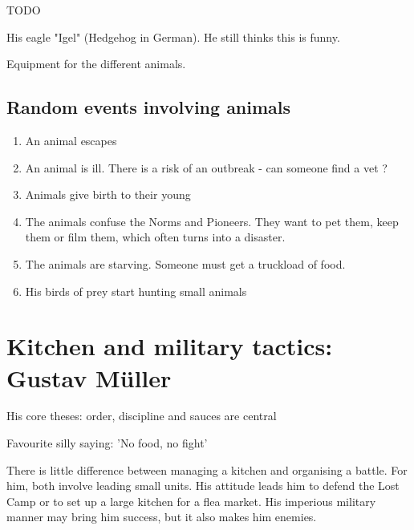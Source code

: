 \begin{npcBox}[title=Jonas Ohnesorg]
    \begin{consequences}
    \item {}
    \item {}
    \item {}
    \end{consequences}

    \begin{npcDescription}
    TODO
    \end{npcDescription}


    \begin{equipment}
    \item His eagle "Igel" (Hedgehog in German). He still thinks this is funny.
    \item Equipment for the different animals.
    \end{equipment}
\end{npcBox}


\subsection{Random events involving animals}

\begin{enumerate}
\item An animal escapes
\item An animal is ill. There is a risk of an outbreak - can someone find a vet ?
\item Animals give birth to their young
\item The animals confuse the Norms and Pioneers. They want to pet them, keep them or film them, which often turns into a disaster.
\item The animals are starving. Someone must get a truckload of food.
\item His birds of prey start hunting small animals
\end{enumerate}

\newpage
\section{Kitchen and military tactics: Gustav Müller}

His core theses: order, discipline and sauces are central

Favourite silly saying: 'No food, no fight'

There is little difference between managing a kitchen and organising a battle. For him, both involve leading small units. His attitude leads him to defend the Lost Camp or to set up a large kitchen for a flea market. His imperious military manner may bring him success, but it also makes him enemies.

